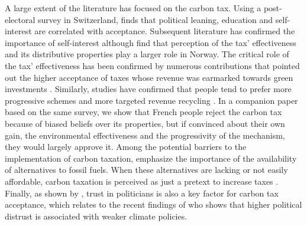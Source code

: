 \documentclass[english,5p,authoryear]{elsarticle}
\begin{document}
A large extent of the literature has focused on the carbon tax. Using a post-electoral survey in Switzerland, \citet{thalmann_public_2004} finds that political leaning, education and self-interest are correlated with acceptance. Subsequent literature has confirmed the importance of self-interest \citep[e.g.][]{fischer_et_al_2011,baranzini_effectiveness_2017} although \cite{kallbekken_saelen_2011} find that perception of the tax' effectiveness and its distributive properties play a larger role in Norway. The critical role of the tax' effectiveness has been confirmed by numerous contributions that pointed out the higher acceptance of taxes whose revenue was earmarked towards green investments \citep[e.g.][]{saelen_kallbekken_2011,baranzini_effectiveness_2017}. Similarly, studies have confirmed that people tend to prefer more progressive schemes \citep{brannlund_tax_2012,gevrek_public_2015} and more targeted revenue recycling \citep{kallbekken_et_al_2011}. In a companion paper \citep{douenne_can_2019} based on the same survey, we show that French people reject the carbon tax because of biased beliefs over its properties, but if convinced about their own gain, the environmental effectiveness and the progressivity of the mechanism, they would largely approve it. Among the potential barriers to the implementation of carbon taxation, \citet{kallbekken_aasen_2010} emphasize the importance of the availability of alternatives to fossil fuels. When these alternatives are lacking or not easily affordable, carbon taxation is perceived as just a pretext to increase taxes \citep{dresner_social_2006,klok_et_al_2006}. Finally, as shown by \citet{harring_jagers_2013}, trust in politicians is also a key factor for carbon tax acceptance, which relates to the recent findings of \citet{rafaty_perceptions_2018} who shows that higher political distrust is associated with weaker climate policies.
\end{document}
